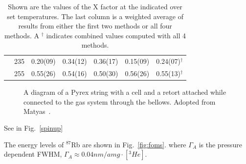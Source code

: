 \documentclass[pdftex,letterpaper,12pt]{report}
\begin{document}
\begin{table}
\begin{center}
\begin{tabular}{|c|c|cccc|c|}
			& 235 & 0.20(09) & 0.34(12) & 0.36(17) & 0.15(09) & 0.24(07)$^\dagger$\\
			& 255 & 0.55(26) & 0.54(16) & 0.50(30) & 0.56(26) & 0.55(13)$^\dagger$\\
			\hline
		\end{tabular}
		\caption
		{Shown are the values of the X factor at the indicated over set temperatures. The last column is a weighted average of results from either the first two methods or all four methods. A $^\dagger$ indicates combined values computed with all 4 methods.}
		\label{table:Xtable}
	\end{center}
\end{table}

\begin{figure}[t!]
	\centering
	\caption{{A diagram of a Pyrex string with a cell and a retort attached while connected to the gas system through the bellows. Adopted from Matyas~\cite{DanThesis}.}}
	\label{cell_gas_system}
\end{figure}

See in Fig.~\ref{spinup}


	
The energy levels of $^{87}$Rb are shown in Fig.~\ref{fig:foms}.
where $\Gamma_{A}$ is the pressure dependent FWHM, $\Gamma_{A}\approx 0.04nm/amg \cdot [^{3}He]$.


\end{document}
